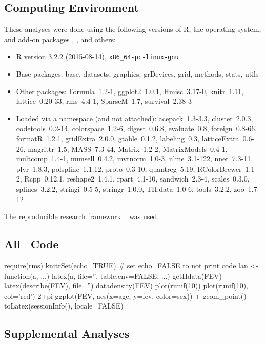 \documentclass{article}\usepackage[]{graphicx}\usepackage[]{color}
\renewcommand{\cite}[1]{\supercite{#1}}   %
\begin{document}
\subsection{Computing Environment}
These analyses were done using the following versions of R\cite{Rsystem}, the
operating system, and add-on packages \cite{Hmisc},
\cite{rrms}, and others:
\begin{itemize}\raggedright
  \item R version 3.2.2 (2015-08-14), \verb|x86_64-pc-linux-gnu|
  \item Base packages: base, datasets, graphics, grDevices, grid,
    methods, stats, utils
  \item Other packages: Formula~1.2-1, ggplot2~1.0.1,
    Hmisc~3.17-0, knitr~1.11, lattice~0.20-33, rms~4.4-1,
    SparseM~1.7, survival~2.38-3
  \item Loaded via a namespace (and not attached):
    acepack~1.3-3.3, cluster~2.0.3, codetools~0.2-14,
    colorspace~1.2-6, digest~0.6.8, evaluate~0.8, foreign~0.8-66,
    formatR~1.2.1, gridExtra~2.0.0, gtable~0.1.2, labeling~0.3,
    latticeExtra~0.6-26, magrittr~1.5, MASS~7.3-44, Matrix~1.2-2,
    MatrixModels~0.4-1, multcomp~1.4-1, munsell~0.4.2,
    mvtnorm~1.0-3, nlme~3.1-122, nnet~7.3-11, plyr~1.8.3,
    polspline~1.1.12, proto~0.3-10, quantreg~5.19,
    RColorBrewer~1.1-2, Rcpp~0.12.1, reshape2~1.4.1, rpart~4.1-10,
    sandwich~2.3-4, scales~0.3.0, splines~3.2.2, stringi~0.5-5,
    stringr~1.0.0, TH.data~1.0-6, tools~3.2.2, zoo~1.7-12
\end{itemize}

The reproducible research framework ~\cite{knitr} was used.


\subsection{All \R\ Code}
\begin{Schunk}
\begin{Sinput}
require(rms)
knitrSet(echo=TRUE)   # set echo=FALSE to not print code
lan <- function(a, ...) latex(a, file='', table.env=FALSE, ...)
getHdata(FEV)
latex(describe(FEV), file='')
datadensity(FEV)
plot(runif(10))
plot(runif(10), col='red')
2+pi
ggplot(FEV, aes(x=age, y=fev, color=sex)) + geom_point()
toLatex(sessionInfo(), locale=FALSE)
\end{Sinput}
\end{Schunk}

\subsection{Supplemental Analyses}



\end{document}
